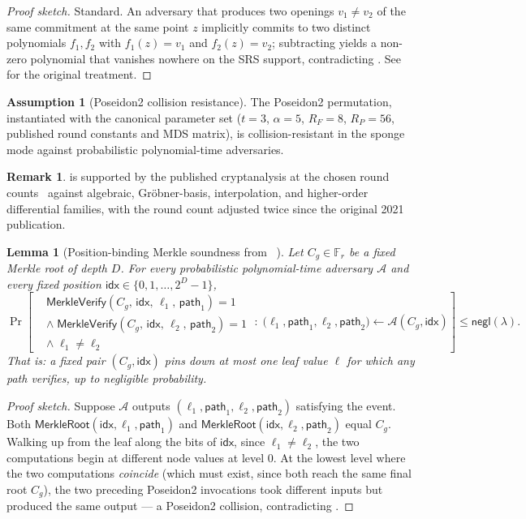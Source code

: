 \documentclass[11pt,a4paper]{article}
\theoremstyle{plain}
\newtheorem{lemma}{Lemma}
\theoremstyle{definition}
\newtheorem{assumption}{Assumption}
\newtheorem{remark}{Remark}
\newcommand{\Fr}{\mathbb{F}_r}
\newcommand{\Cg}{C_g}
\newcommand{\negl}{\mathsf{negl}}
\newcommand{\Adv}{\mathcal{A}}
\newcommand{\MerkleVerify}{\mathsf{MerkleVerify}}
\newcommand{\MerkleRoot}{\mathsf{MerkleRoot}}
\newcommand{\Idx}{\mathsf{idx}}
\newcommand{\Pth}{\mathsf{path}}
\begin{document}
\begin{proof}[Proof sketch]
Standard. An adversary that produces two openings $v_1 \ne v_2$
of the same commitment at the same point $z$ implicitly commits
to two distinct polynomials $f_1, f_2$ with $f_1(z) = v_1$ and
$f_2(z) = v_2$; subtracting yields a non-zero polynomial that
vanishes nowhere on the SRS support, contradicting
. See~\cite{kate-2010-kzg} for the original
treatment.
\end{proof}

\begin{assumption}[Poseidon2 collision resistance]
\label{ass:p2cr}
The Poseidon2 permutation, instantiated with the canonical
parameter set ($t=3$, $\alpha=5$, $R_F=8$, $R_P=56$, published
round constants and MDS matrix), is collision-resistant in the
sponge mode against probabilistic polynomial-time adversaries.
\end{assumption}

\begin{remark}
 is supported by the published cryptanalysis at the
chosen round counts~\cite{grassi-2023-poseidon2,grassi-2021-poseidon}
against algebraic, Gröbner-basis, interpolation, and higher-order
differential families, with the round count adjusted twice since
the original 2021 publication.
\end{remark}

\begin{lemma}[Position-binding Merkle soundness from
~\cite{merkle-1989-tree}]
\label{lem:merkle}
Let $\Cg \in \Fr$ be a fixed Merkle root of depth $D$. For every
probabilistic polynomial-time adversary $\Adv$ and every fixed
position $\Idx \in \{0,1,\ldots,2^{D}-1\}$,
\[
\Pr\!\left[
\begin{aligned}
&\MerkleVerify(\Cg,\, \Idx,\, \ell_1,\, \Pth_1) = 1 \\
&\wedge\; \MerkleVerify(\Cg,\, \Idx,\, \ell_2,\, \Pth_2) = 1 \\
&\wedge\; \ell_1 \ne \ell_2
\end{aligned}
\;:\;
\bigl(\ell_1, \Pth_1, \ell_2, \Pth_2\bigr) \leftarrow \Adv(\Cg, \Idx)
\right] \le \negl(\lambda).
\]
That is: a fixed pair $(\Cg, \Idx)$ pins down at most one leaf
value $\ell$ for which any path verifies, up to negligible
probability.
\end{lemma}

\begin{proof}[Proof sketch]
Suppose $\Adv$ outputs $(\ell_1, \Pth_1, \ell_2, \Pth_2)$
satisfying the event. Both
$\MerkleRoot(\Idx, \ell_1, \Pth_1)$ and
$\MerkleRoot(\Idx, \ell_2, \Pth_2)$ equal $\Cg$. Walking up from
the leaf along the bits of $\Idx$, since $\ell_1 \ne \ell_2$, the
two computations begin at different node values at level $0$. At
the lowest level where the two computations \emph{coincide} (which
must exist, since both reach the same final root $\Cg$), the two
preceding Poseidon2 invocations took different inputs but produced
the same output --- a Poseidon2 collision, contradicting
.
\end{proof}
\end{document}
